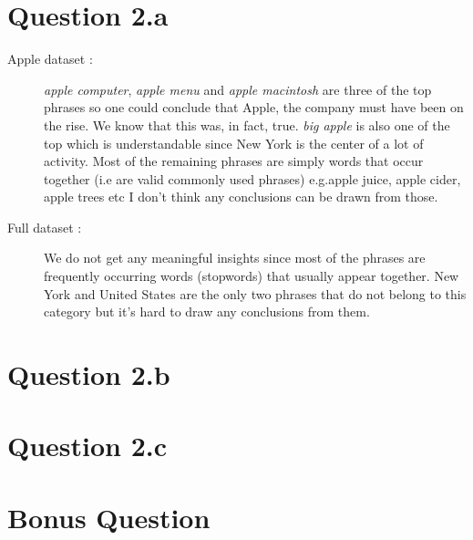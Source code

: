 \documentclass[paper=a4, fontsize=11pt]{scrartcl} %
\numberwithin{equation}{section} %
\numberwithin{figure}{section} %
\numberwithin{table}{section} %
\begin{document}
\section*{\textbf{Question 2.a}}
\begin{description}
\item[Apple dataset :] \textit{apple computer}, \textit{apple menu} and \textit{apple macintosh} are three of the top phrases so one could conclude that Apple, the company must have been on the rise. We know that this was, in fact, true. \textit{big apple} is also one of the top which is understandable since New York is the center of a lot of activity. Most of the remaining phrases are simply words that occur together (i.e are valid commonly used phrases) e.g.apple juice, apple cider, apple trees etc I don't think any conclusions can be drawn from those.
\item[Full dataset :] We do not get any meaningful insights since most of the phrases are frequently occurring words (stopwords) that usually appear together. New York and United States are the only two phrases that do not belong to this category but it's hard to draw any conclusions from them.
\end{description}

\section*{\textbf{Question 2.b}}

\section*{\textbf{Question 2.c}}

\section*{\textbf{Bonus Question}}
\end{document}
